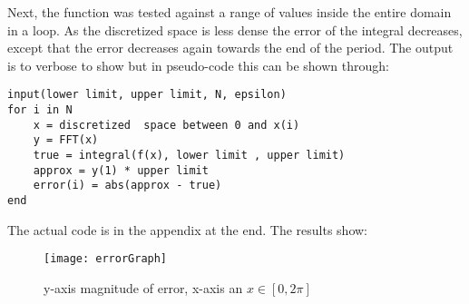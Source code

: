 \documentclass[]{article}
\begin{document}
Next, the function was tested against a range of values inside the entire domain in a loop.  As the discretized space is less dense the error of the integral decreases, except that the error decreases again towards the end of the period. The output is to verbose to show but in pseudo-code this can be shown through: \\

\begin{lstlisting}
input(lower limit, upper limit, N, epsilon)
for i in N
	x = discretized  space between 0 and x(i)	
	y = FFT(x)
	true = integral(f(x), lower limit , upper limit)
	approx = y(1) * upper limit
	error(i) = abs(approx - true)
end
\end{lstlisting}

The actual code is in the appendix at the end. The results show: \\
\begin{center}
\begin{figure}[H]
\centering
\texttt{[image: errorGraph]}
\caption{y-axis magnitude of error, x-axis an $ x \in [0, 2\pi]$}
\end{figure} 
\end{center}
\end{document}
